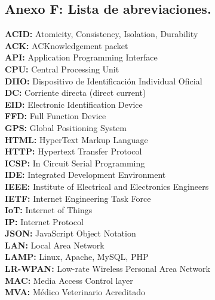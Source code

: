 \subsection*{Anexo F: Lista de abreviaciones.}
\label{anexo-e}

\vspace{0.5cm}

\begin{spacing}{1.2}
\textbf{ACID:} Atomicity, Consistency, Isolation, Durability\\ 
\textbf{ACK:} ACKnowledgement packet\\
\textbf{API:} Application Programming Interface\\
\textbf{CPU:} Central Processing Unit\\
\textbf{DIIO:} Dispositivo de Identificación Individual Oficial\\
\textbf{DC:} Corriente directa (direct current)\\
\textbf{EID:} Electronic Identification Device\\
\textbf{FFD:} Full Function Device\\
\textbf{GPS:} Global Positioning System\\
\textbf{HTML:} HyperText Markup Language\\
\textbf{HTTP:} Hypertext Transfer Protocol\\
\textbf{ICSP:} In Circuit Serial Programming\\
\textbf{IDE:} Integrated Development Environment\\
\textbf{IEEE:} Institute of Electrical and Electronics Engineers\\
\textbf{IETF:} Internet Engineering Task Force\\
\textbf{IoT:} Internet of Things\\
\textbf{IP:} Internet Protocol\\
\textbf{JSON:} JavaScript Object Notation\\
\textbf{LAN:} Local Area Network\\
\textbf{LAMP:} Linux, Apache, MySQL, PHP\\
\textbf{LR-WPAN:} Low-rate Wireless Personal Area Network\\
\textbf{MAC:} Media Access Control layer\\ 
\textbf{MVA:} Médico Veterinario Acreditado\\ 

\end{spacing}
